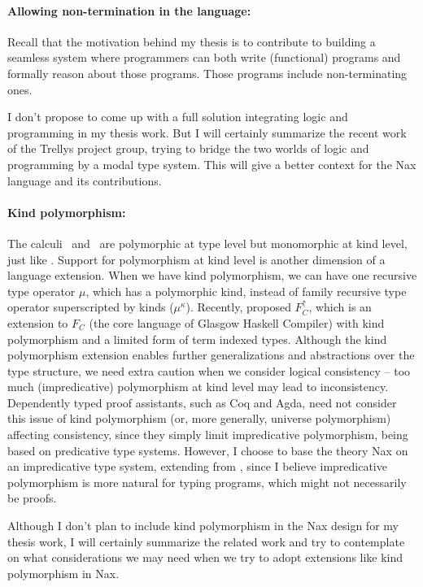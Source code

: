 \paragraph{Allowing non-termination in the language:}
Recall that the motivation behind my thesis is to contribute to 
building a seamless system where programmers can both write
(functional) programs and formally reason about those programs.
Those programs include non-terminating ones.

I don't propose to come up with a full solution integrating logic and
programming in my thesis work. But I will certainly summarize the recent
work \cite{} of the Trellys project group, trying to bridge the two worlds of
logic and programming by a modal type system. This will give a better context
for the Nax language and its contributions.

\paragraph{Kind polymorphism:}
The calculi \Fi\ and \Fixi\ are polymorphic at type level but monomorphic at
kind level, just like \Fw. Support for polymorphism at kind level is another
dimension of a language extension. When we have kind polymorphism, we can
have one recursive type operator $\mu$, which has a polymorphic kind, instead
of family recursive type operator superscripted by kinds ($\mu^\kappa$).
Recently, \citet{YorWeiCrePeyVytMag12} proposed $F_C^{\uparrow}$, which is
an extension to $F_C$ (the core language of Glasgow Haskell Compiler)
with kind polymorphism and a limited form of term indexed types.
Although the kind polymorphism extension enables further generalizations and
abstractions over the type structure, we need extra caution when we consider
logical consistency -- too much (impredicative) polymorphism at kind level may
lead to inconsistency. Dependently typed proof assistants, such as Coq and Agda,
need not consider this issue of kind polymorphism (or, more generally,
universe polymorphism) affecting consistency, since they simply limit
impredicative polymorphism, being based on predicative type systems.
However, I choose to base the theory Nax on an impredicative type system,
extending from \Fw, since I believe impredicative polymorphism is
more natural for typing programs, which might not necessarily be proofs.

Although I don't plan to include kind polymorphism in the Nax design for
my thesis work, I will certainly summarize the related work and try to
contemplate on what considerations we may need when we try to adopt
extensions like kind polymorphism in Nax.

